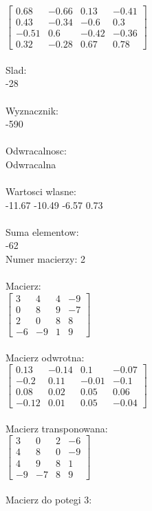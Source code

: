 \documentclass[a4paper,12pt]{article}
\begin{document}
$\begin{bmatrix} 0.68&-0.66&0.13&-0.41\\0.43&-0.34&-0.6&0.3\\-0.51&0.6&-0.42&-0.36\\0.32&-0.28&0.67&0.78 \end{bmatrix}$
\\
\\
Slad:\\
-28
\\
\\
Wyznacznik:\\
-590
\\
\\
Odwracalnosc:\\
Odwracalna
\\
\\
Wartosci wlasne:\\
-11.67 -10.49 -6.57 0.73
\\
\\
Suma elementow:\\
-62
\\
\newpage
Numer macierzy:
2
\\
\\
Macierz:\\

$\begin{bmatrix} 3&4&4&-9\\0&8&9&-7\\2&0&8&8\\-6&-9&1&9 \end{bmatrix}$
\\
\\
Macierz odwrotna:\\

$\begin{bmatrix} 0.13&-0.14&0.1&-0.07\\-0.2&0.11&-0.01&-0.1\\0.08&0.02&0.05&0.06\\-0.12&0.01&0.05&-0.04 \end{bmatrix}$
\\
\\
Macierz transponowana:\\

$\begin{bmatrix} 3&0&2&-6\\4&8&0&-9\\4&9&8&1\\-9&-7&8&9 \end{bmatrix}$
\\
\\
Macierz do potegi 3:\\
\end{document}
